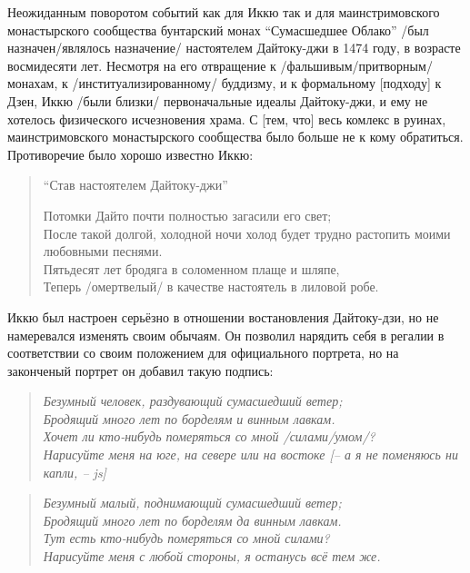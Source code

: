 \begin{ver}
Неожиданным поворотом событий как для Иккю так и для маинстримовского
монастырского сообщества бунтарский
монах ``Сумасшедшее Облако'' /был назначен/являлось назначение/
настоятелем Дайтоку-джи в 1474 году, в возрасте восмидесяти лет.
Несмотря на его отвращение к /фальшивым/притворным/
монахам, к /институализированному/ буддизму, и к формальному [подходу]
к Дзен, Иккю /были близки/ первоначальные идеалы
Дайтоку-джи, и ему не хотелось физического исчезновения храма.
С [тем, что] весь комлекс в руинах, маинстримовского
монастырского сообщества было больше не к кому обратиться.
Противоречие было хорошо известно Иккю:
\end{ver}

\begin{ver}
  \begin{verse}\it
  \centerline{``Став настоятелем Дайтоку-джи''}
  Потомки Дайто почти полностью загасили его свет;\\
  После такой долгой, холодной ночи холод будет трудно растопить моими
  любовными песнями.\\
  Пятьдесят лет бродяга в соломенном плаще и шляпе,\\
  Теперь /омертвелый/ в качестве настоятель в лиловой робе.
  \end{verse}
\end{ver}

\begin{ver}
  Иккю был настроен серьёзно в отношении востановления Дайтоку-дзи, но
  не намеревался изменять своим обычаям. Он позволил нарядить себя в
  регалии в соответствии со своим положением для официального
  портрета, но на законченый портрет он добавил такую подпись: 
\end{ver}

\begin{ver}
  \begin{verse}\it
    Безумный человек, раздувающий сумасшедший ветер;\\
    Бродящий много лет по борделям и винным лавкам.\\
    Хочет ли кто-нибудь померяться со мной /силами/умом/?\\
    Нарисуйте меня  на юге, на севере или на востоке [-- а я не
      поменяюсь ни капли, -- js]
  \end{verse}
\end{ver}

\begin{ver}[1]
  \begin{verse}\it
    Безумный малый, поднимающий сумасшедший ветер;\\
    Бродящий много лет по борделям да винным лавкам.\\
    Тут есть кто-нибудь померяться со мной силами?\\
    Нарисуйте меня с любой стороны, я останусь всё тем же.
  \end{verse}
\end{ver}

